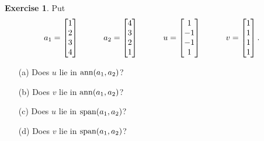 \documentclass[a4paper]{amsart}
\theoremstyle{definition}
\newtheorem{exercise}{Exercise}
\begin{document}
\begin{exercise}\label{ex-check-ann-span}
 Put 
 \[ a_1 = \left[\begin{matrix} 1 \\ 2 \\ 3 \\ 4 \end{matrix}\right] \hspace{3em}
    a_2 = \left[\begin{matrix} 4 \\ 3 \\ 2 \\ 1 \end{matrix}\right] \hspace{3em}
    u = \left[\begin{matrix} 1 \\ -1 \\ -1 \\ 1 \end{matrix}\right] \hspace{3em}
    v = \left[\begin{matrix} 1 \\ 1 \\ 1 \\ 1 \end{matrix}\right].
 \]
 \begin{itemize}
  \item[(a)] Does $u$ lie in $\operatorname{ann}(a_1,a_2)$?
  \item[(b)] Does $v$ lie in $\operatorname{ann}(a_1,a_2)$?
  \item[(c)] Does $u$ lie in $\operatorname{span}(a_1,a_2)$?
  \item[(d)] Does $v$ lie in $\operatorname{span}(a_1,a_2)$?
 \end{itemize}
\end{exercise}
\end{document}
